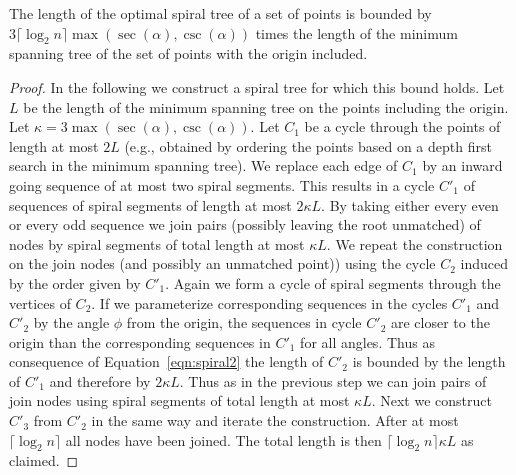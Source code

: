 \documentclass{journalA4}
\begin{document}
\begin{theorem}
The length of the optimal spiral tree of a set of points is bounded by \\$3 \lceil \log_2 n \rceil \max (\sec (\alpha), \csc (\alpha ))$ times the length of the minimum spanning tree of the set of points with the origin included.
\end{theorem}
\begin{proof}
In the following we construct a spiral tree for which this bound holds. Let $L$ be the length of the minimum spanning tree on the points including the origin. Let $\kappa = 3 \max (\sec (\alpha), \csc (\alpha ))$. Let $C_1$ be a cycle through the points of length at most $2L$ (e.g., obtained by ordering the points based on a depth first search in the minimum spanning tree). We replace each edge of $C_1$ by an inward going sequence of at most two spiral segments. This results in a cycle $C'_1$ of sequences of spiral segments of length at most $2\kappa L$. By taking either every even or every odd sequence we join pairs (possibly leaving the root unmatched) of nodes by spiral segments of total length at most $\kappa L$. We repeat the construction on the join nodes (and possibly an unmatched point)) using the cycle $C_2$ induced by the order given by $C'_1$. Again we form a cycle of spiral segments through the vertices of $C_2$. If we parameterize corresponding sequences in the cycles $C'_1$ and $C'_2$ by the angle $\phi$ from the origin, the sequences in cycle $C'_2$ are closer to the origin than the corresponding sequences in $C'_1$ for all angles. Thus as consequence of Equation~\ref{eqn:spiral2} the length of $C'_2$ is bounded by the length of $C'_1$ and therefore by $2\kappa L$. Thus as in the previous step we can join pairs of join nodes using spiral segments of total length at most $\kappa L$. Next we construct $C'_3$ from $C'_2$ in the same way and iterate the construction. After at most $\lceil \log_2 n \rceil$ all nodes have been joined. The total length is then $\lceil \log_2 n \rceil \kappa L$ as claimed.
\end{proof}

\noindent
\end{document}
